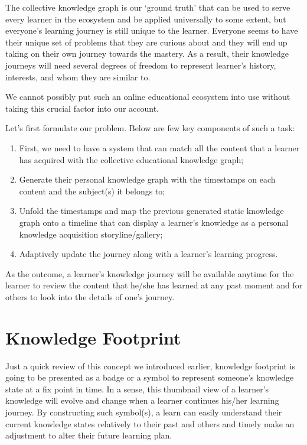 \documentclass{acm_proc_article-sp}
\begin{document}
The collective knowledge graph is our `ground truth' that can be used to
serve every learner in the ecosystem and be applied universally to some
extent, but everyone's learning journey is still unique to the learner.
Everyone seems to have their unique set of problems that they are
curious about and they will end up taking on their own journey towards
the mastery. As a result, their knowledge journeys will need several
degrees of freedom to represent learner's history, interests, and whom
they are similar to.

We cannot possibly put such an online educational ecosystem into use
without taking this crucial factor into our account.

Let's first formulate our problem. Below are few key components of such
a task:

\begin{enumerate}
\def\labelenumi{\arabic{enumi}.}
\item
  First, we need to have a system that can match all the content that a
  learner has acquired with the collective educational knowledge graph;
\item
  Generate their personal knowledge graph with the timestamps on each
  content and the subject(s) it belongs to;
\item
  Unfold the timestamps and map the previous generated static knowledge
  graph onto a timeline that can display a learner's knowledge as a
  personal knowledge acquisition storyline/gallery;
\item
  Adaptively update the journey along with a learner's learning
  progress.
\end{enumerate}

As the outcome, a learner's knowledge journey will be available anytime
for the learner to review the content that he/she has learned at any
past moment and for others to look into the details of one's journey.

\section{Knowledge Footprint}\label{knowledge-footprint-1}

Just a quick review of this concept we introduced earlier, knowledge
footprint is going to be presented as a badge or a symbol to represent
someone's knowledge state at a fix point in time. In a sense, this
thumbnail view of a learner's knowledge will evolve and change when a
learner continues his/her learning journey. By constructing such
symbol(s), a learn can easily understand their current knowledge states
relatively to their past and others and timely make an adjustment to
alter their future learning plan.
\end{document}
